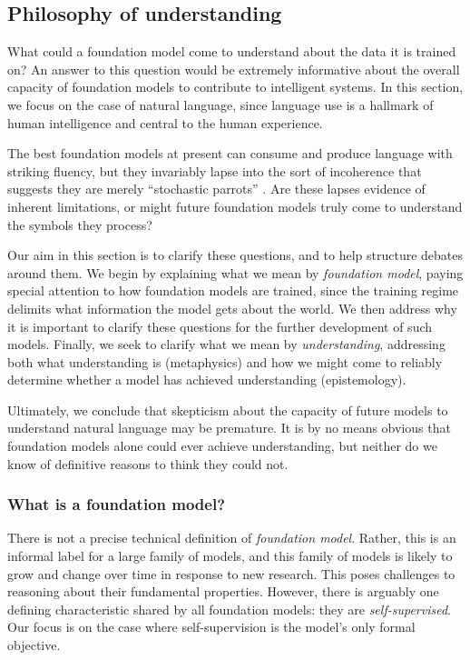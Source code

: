 \newsection
\subsection{Philosophy of understanding}
\label{sec:philosophy}


What could a foundation model come to understand about the data it is trained on? An answer to this question would be extremely informative about the overall capacity of foundation models to contribute to intelligent systems. In this section, we focus on the case of natural language, since language use is a hallmark of human intelligence and central to the human experience. 

The best foundation models at present can consume and produce language with striking fluency, but they invariably lapse into the sort of incoherence that suggests they are merely “stochastic parrots” \citep{bender2021}. Are these lapses evidence of inherent limitations, or might future foundation models truly come to understand the symbols they process?

Our aim in this section is to clarify these questions, and to help structure debates around them. We begin by explaining what we mean by \textit{foundation model}, paying special attention to how foundation models are trained, since the training regime delimits what information the model gets about the world. We then address why it is important to clarify these questions for the further development of such models.  Finally, we seek to clarify what we mean by \textit{understanding}, addressing both what understanding is (metaphysics) and how we might come to reliably determine whether a model has achieved understanding (epistemology).

Ultimately, we conclude that skepticism about the capacity of future models to understand natural language may be premature. It is by no means obvious that foundation models alone could ever achieve understanding, but neither do we know of definitive reasons to think they could not.

\subsubsection{What is a foundation model?}

There is not a precise technical definition of \textit{foundation model}. Rather, this is an informal label for a large family of models, and this family of models is likely to grow and change over time in response to new research. This poses challenges to reasoning about their fundamental properties. However, there is arguably one defining characteristic shared by all foundation models: they are \textit{self-supervised}. Our focus is on the case where self-supervision is the model’s only formal objective.

